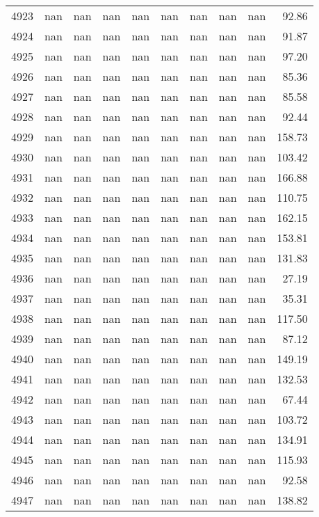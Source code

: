 \begin{tabular}{lrrrrrrrrr}
4923 & nan & nan & nan & nan & nan & nan & nan & nan & 92.86 \\
4924 & nan & nan & nan & nan & nan & nan & nan & nan & 91.87 \\
4925 & nan & nan & nan & nan & nan & nan & nan & nan & 97.20 \\
4926 & nan & nan & nan & nan & nan & nan & nan & nan & 85.36 \\
4927 & nan & nan & nan & nan & nan & nan & nan & nan & 85.58 \\
4928 & nan & nan & nan & nan & nan & nan & nan & nan & 92.44 \\
4929 & nan & nan & nan & nan & nan & nan & nan & nan & 158.73 \\
4930 & nan & nan & nan & nan & nan & nan & nan & nan & 103.42 \\
4931 & nan & nan & nan & nan & nan & nan & nan & nan & 166.88 \\
4932 & nan & nan & nan & nan & nan & nan & nan & nan & 110.75 \\
4933 & nan & nan & nan & nan & nan & nan & nan & nan & 162.15 \\
4934 & nan & nan & nan & nan & nan & nan & nan & nan & 153.81 \\
4935 & nan & nan & nan & nan & nan & nan & nan & nan & 131.83 \\
4936 & nan & nan & nan & nan & nan & nan & nan & nan & 27.19 \\
4937 & nan & nan & nan & nan & nan & nan & nan & nan & 35.31 \\
4938 & nan & nan & nan & nan & nan & nan & nan & nan & 117.50 \\
4939 & nan & nan & nan & nan & nan & nan & nan & nan & 87.12 \\
4940 & nan & nan & nan & nan & nan & nan & nan & nan & 149.19 \\
4941 & nan & nan & nan & nan & nan & nan & nan & nan & 132.53 \\
4942 & nan & nan & nan & nan & nan & nan & nan & nan & 67.44 \\
4943 & nan & nan & nan & nan & nan & nan & nan & nan & 103.72 \\
4944 & nan & nan & nan & nan & nan & nan & nan & nan & 134.91 \\
4945 & nan & nan & nan & nan & nan & nan & nan & nan & 115.93 \\
4946 & nan & nan & nan & nan & nan & nan & nan & nan & 92.58 \\
4947 & nan & nan & nan & nan & nan & nan & nan & nan & 138.82 \\

\end{tabular}
